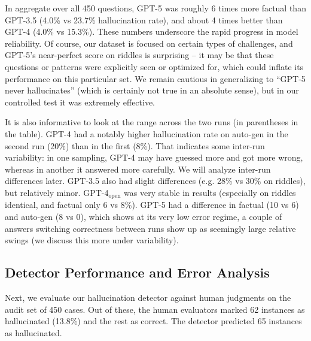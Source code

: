 \documentclass{article}
\begin{document}
In aggregate over all 450 questions, GPT-5 was roughly 6 times more factual than GPT-3.5 (4.0\% vs 23.7\% hallucination rate), and about 4 times better than GPT-4 (4.0\% vs 15.3\%). These numbers underscore the rapid progress in model reliability. Of course, our dataset is focused on certain types of challenges, and GPT-5's near-perfect score on riddles is surprising -- it may be that these questions or patterns were explicitly seen or optimized for, which could inflate its performance on this particular set. We remain cautious in generalizing to “GPT-5 never hallucinates” (which is certainly not true in an absolute sense), but in our controlled test it was extremely effective.

It is also informative to look at the range across the two runs (in parentheses in the table). GPT-4 had a notably higher hallucination rate on auto-gen in the second run (20\%) than in the first (8\%). That indicates some inter-run variability: in one sampling, GPT-4 may have guessed more and got more wrong, whereas in another it answered more carefully. We will analyze inter-run differences later. GPT-3.5 also had slight differences (e.g. 28\% vs 30\% on riddles), but relatively minor. GPT-4$_\text{open}$ was very stable in results (especially on riddles identical, and factual only 6 vs 8\%). GPT-5 had a difference in factual (10 vs 6) and auto-gen (8 vs 0), which shows at its very low error regime, a couple of answers switching correctness between runs show up as seemingly large relative swings (we discuss this more under variability).

\subsection{Detector Performance and Error Analysis}
Next, we evaluate our hallucination detector against human judgments on the audit set of 450 cases. Out of these, the human evaluators marked 62 instances as hallucinated (13.8\%) and the rest as correct. The detector predicted 65 instances as hallucinated.
\end{document}
